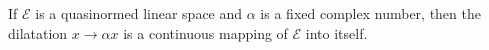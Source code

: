 If $\mathcal{E}$ is a quasinormed linear space and $\alpha$ is a fixed complex number, then the dilatation $x \to \alpha x$ is a continuous mapping of $\mathcal{E}$ into itself.
